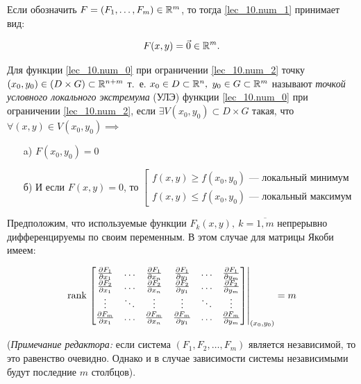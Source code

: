 \documentclass[../../main.tex]{subfiles}
\begin{document}
	Если обозначить $F = \left( F_1, \ldots, F_m \right) \in \mathbb{R}^m$, 
	то тогда \eqref{lec_10.num_1} принимает вид:
	
	\begin{equation} \label{lec_10.num_2}
		F(x, y) = \vec{0} \in \mathbb{R}^m.
	\end{equation}
	
	Для функции \eqref{lec_10.num_0} при ограничении \eqref{lec_10.num_2}
	точку $(x_0, y_0) \in \left( D \times G \right) 
	\subset \mathbb{R}^{n+m}$
	т.~е. $x_0 \in D \subset \mathbb{R}^n,$ $y_0 \in G \subset \mathbb{R}^m$ называют
	\emph{точкой условного локального экстремума} (УЛЭ) функции 
	\eqref{lec_10.num_0} при ограничении \eqref{lec_10.num_2}, если
	$\exists V( x_0, y_0 ) \subset D \times G $ такая, что 
	$\forall ( x, y) \in V( x_0, y_0) \implies $
	
	\begin{itemize}
		\item[a)] 
		$F(x_0, y_0) = 0$
		\item[б)] И если $F(x, y) = 0$, то
		$\left[ \begin{gathered}
		f(x, y) \ge f(x_0, y_0)\text{~--- локальный минимум} \\
		f(x, y) \le f(x_0, y_0)\text{~--- локальный максимум} 
		\end{gathered} \right.$
	\end{itemize}
		
Предположим, что используемые функции $F_k(x,y),\ k = \overline{1, m}$ 
непрерывно дифференцируемы по своим переменным. В этом случае для 
матрицы Якоби имеем:

\begin{equation} \label{lec_10.num_3}
	\operatorname{rank} \left.\begin{bmatrix}
	\frac{\partial F_1}{\partial x_1} & \ldots & \frac{\partial F_1}{\partial x_n} & 
	\frac{\partial F_1}{\partial y_1} & \ldots & \frac{\partial F_1}{\partial y_m} \\
	\frac{\partial F_2}{\partial x_1} & \ldots & \frac{\partial F_2}{\partial x_n} &
	\frac{\partial F_2}{\partial y_1} & \ldots & \frac{\partial F_2}{\partial y_m} \\
	\vdots & \ddots & \vdots & \vdots & \ddots & \vdots \\
	\frac{\partial F_m}{\partial x_1} & \ldots & \frac{\partial F_m}{\partial x_n} &
	\frac{\partial F_m}{\partial y_1} & \ldots & \frac{\partial F_m}{\partial y_m}
	\end{bmatrix}
	\right|_{(x_0, y_0)} = m
\end{equation}

(\emph{Примечание редактора:} если система $(F_1, F_2, \ldots, F_m)$ является независимой, то это равенство очевидно. 
Однако и в случае зависимости системы независимыми будут последние $m$ столбцов). 		
		
\end{document}
